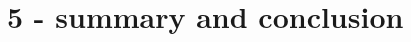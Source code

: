 \documentclass[\main/master.tex]{subfiles}
\begin{document}
\chapter{5 - summary and conclusion}\label{chp:example-2}
\end{document}
